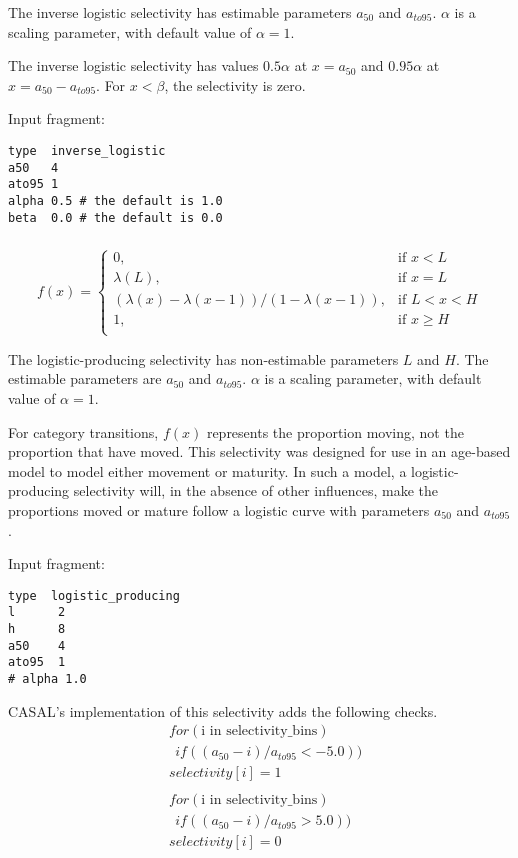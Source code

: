 The inverse logistic selectivity has estimable parameters $a_{50}$ and $a_{to95}$. $\alpha$ is a scaling parameter, with default value of $\alpha = 1$. 

The inverse logistic selectivity has values $0.5 \alpha$ at $x=a_{50}$ and $0.95 \alpha$ at $x=a_{50}-a_{to95}$. For $x < \beta$, the selectivity is zero.


Input fragment: {\small{\begin{verbatim}
type  inverse_logistic
a50   4
ato95 1
alpha 0.5 # the default is 1.0
beta  0.0 # the default is 0.0
\end{verbatim}}}

\subsubsection[Logistic producing]{}\label{sec:Selectivity-LogisticProducing}

\begin{equation}
f(x)=\begin{cases}
	  0, & \text{if $x < L$} \\
	  \lambda(L), & \text{if $x=L$} \\
	  \left( \lambda(x)-\lambda(x-1) \right) / \left( 1-\lambda(x-1) \right), & \text{if $L < x < H$} \\
	  1, & \text{if $x \ge H$} \\
  \end{cases}
\end{equation}

The logistic-producing selectivity has non-estimable parameters $L$ and $H$. The estimable parameters are $a_{50}$ and $a_{to95}$. $\alpha$ is a scaling parameter, with default value of $\alpha = 1$.

For category transitions, $f(x)$ represents the proportion moving, not the proportion that have moved. This selectivity was designed for use in an age-based model to model either movement or maturity. In such a model, a logistic-producing  selectivity will, in the absence of other influences, make the proportions moved or mature follow a logistic curve with parameters $a_{50}$ and $a_{to95}$.

Input fragment: {\small{\begin{verbatim}
type  logistic_producing
l      2
h      8
a50    4
ato95  1
# alpha 1.0
\end{verbatim}}}

CASAL's implementation of this selectivity adds the following checks.
\begin{align*}
	&for(\text{i in selectivity\_bins}) \\
	& \ \ if((a_{50} - i)/a_{to95} < -5.0))\\
	&selectivity[i] = 1 \\ \\ 
&for(\text{i in selectivity\_bins}) \\
& \ \ if((a_{50} - i)/a_{to95} > 5.0))\\
&selectivity[i] = 0
\end{align*}


